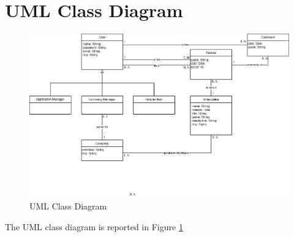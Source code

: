 \section{UML Class Diagram}
\begin{figure}[hbt!]
	\centering
	\includegraphics[width=1\textwidth]{chapter3/img/uml.png}
	\caption{UML Class Diagram}
	\label{fig:uml}
\end{figure}
The UML class diagram is reported in Figure \ref{fig:uml}
